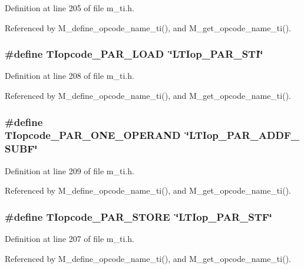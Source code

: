 Definition at line 205 of file m\_\-ti.h.

Referenced by M\_\-define\_\-opcode\_\-name\_\-ti(), and M\_\-get\_\-opcode\_\-name\_\-ti().
\subsubsection{\setlength{\rightskip}{0pt plus 5cm}\#define TIopcode\_\-PAR\_\-LOAD~\char`\"{}LTIop\_\-PAR\_\-STI\char`\"{}}\label{m__ti_8h_f3c2085442562864ca056b87ae5f72bc}




Definition at line 208 of file m\_\-ti.h.

Referenced by M\_\-define\_\-opcode\_\-name\_\-ti(), and M\_\-get\_\-opcode\_\-name\_\-ti().
\subsubsection{\setlength{\rightskip}{0pt plus 5cm}\#define TIopcode\_\-PAR\_\-ONE\_\-OPERAND~\char`\"{}LTIop\_\-PAR\_\-ADDF\_\-SUBF\char`\"{}}\label{m__ti_8h_0ca96fac6da4faaaae0d4e31b905f822}




Definition at line 209 of file m\_\-ti.h.

Referenced by M\_\-define\_\-opcode\_\-name\_\-ti(), and M\_\-get\_\-opcode\_\-name\_\-ti().
\subsubsection{\setlength{\rightskip}{0pt plus 5cm}\#define TIopcode\_\-PAR\_\-STORE~\char`\"{}LTIop\_\-PAR\_\-STF\char`\"{}}\label{m__ti_8h_892f533b3b4411ccda3561fa32642d51}




Definition at line 207 of file m\_\-ti.h.

Referenced by M\_\-define\_\-opcode\_\-name\_\-ti(), and M\_\-get\_\-opcode\_\-name\_\-ti().

